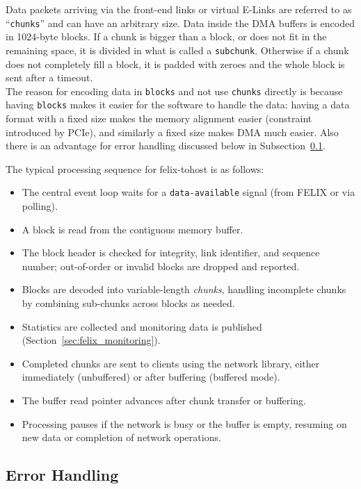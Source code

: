 Data packets arriving via the front-end links or virtual E-Links are referred to as “\texttt{chunks}” and can have an arbitrary size. Data inside the \acs{DMA} buffers is encoded in 1024-byte blocks. If a chunk is bigger than a block, or does not fit in the remaining space, it is divided in what is called a \texttt{subchunk}. Otherwise if a chunk does not completely fill a block, it is padded with zeroes and the whole block is sent after a timeout.\\
The reason for encoding data in \texttt{blocks} and not use \texttt{chunks} directly is because having \texttt{blocks} makes it easier for the software to handle the data: having a data format with a fixed size makes the memory alignment easier (constraint introduced by \acs{PCIe}), and similarly a fixed size makes \acs{DMA} much easier. Also there is an advantage for error handling discussed below in Subsection~\ref{sec:felix_tohost_error_handling}.

The typical processing sequence for felix-tohost is as follows:
\begin{itemize}
    \item The central event loop waits for a \texttt{data-available} signal (from \acs{FELIX} or via polling).
    \item A block is read from the contiguous memory buffer.
    \item The block header is checked for integrity, link identifier, and sequence number; out-of-order or invalid blocks are dropped and reported.
    \item Blocks are decoded into variable-length \emph{chunks}, handling incomplete chunks by combining sub-chunks across blocks as needed.
    \item Statistics are collected and monitoring data is published (Section~\ref{sec:felix_monitoring}).
    \item Completed chunks are sent to clients using the network library, either immediately (unbuffered) or after buffering (buffered mode).
    \item The buffer read pointer advances after chunk transfer or buffering.
    \item Processing pauses if the network is busy or the buffer is empty, resuming on new data or completion of network operations.
\end{itemize}

\subsection{Error Handling}
\label{sec:felix_tohost_error_handling}

